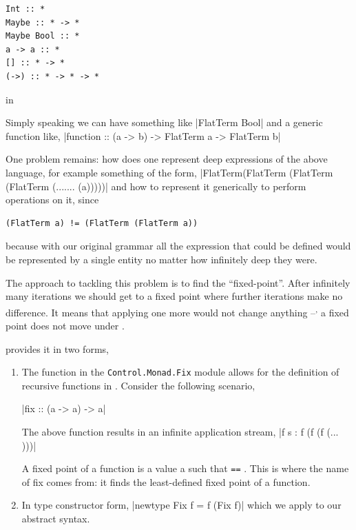 \documentclass[thesis-solanki.tex]{subfiles}
\begin{document}
\begin{code-list}[H]
\begin{verbatim}
Int :: *
Maybe :: * -> *
Maybe Bool :: *
a -> a :: *
[] :: * -> *
(->) :: * -> * -> *
\end{verbatim}
\caption{ in }
\label{tab:kindsinhaskell}
\end{code-list}

Simply speaking we can have something like
|FlatTerm Bool|
and a generic function like,
|function :: (a -> b) -> FlatTerm a -> FlatTerm b|

One problem remains: how does one represent deep expressions
of the above language, 
for example something of the form,
|FlatTerm(FlatTerm (FlatTerm (FlatTerm (....... (a)))))|
and how to represent it generically to perform operations on it, since
\begin{verbatim}
(FlatTerm a) != (FlatTerm (FlatTerm a))
\end{verbatim}
%
because with our original grammar all the expression that could be defined would be represented by a single entity
 no matter how infinitely deep they were.

The approach to tackling this problem is to find the ``fixed-point''.
After infinitely many iterations we should get to a fixed point where further iterations make no
difference.
It means that applying one more  would not change anything --\textsuperscript{,}
a fixed point does not move under .

 provides it in two forms,
\begin{enumerate}

\item The  function in the \texttt{Control.Monad.Fix} module allows for the definition of recursive functions in . Consider the following scenario,

|fix :: (a -> a) -> a|

The above function results in an infinite application stream,
|f s : f (f (f (... )))|

A fixed point of a function  is a value a such that  \Verb!==! .
This is where the name of fix comes from: it finds the least-defined fixed
point of a function.

\item In type constructor form,
|newtype Fix f = f (Fix f)|
which we apply to our abstract syntax.

\end{enumerate}
\end{document}
